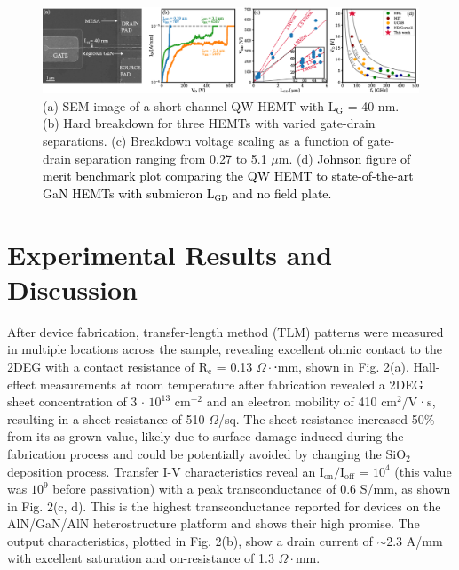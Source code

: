 \documentclass[journal]{IEEEtran}
\begin{document}
\begin{figure}[!t]
\centering
\includegraphics[width=\textwidth]{Figure4_JFoM_largerinset.eps}
\caption{ (a) SEM image of a short-channel QW HEMT with $\mathrm{L_G}$ = 40 nm. (b) Hard breakdown for three HEMTs with varied gate-drain separations. (c) Breakdown voltage scaling as a function of gate-drain separation ranging from 0.27 to 5.1 $\mu$m. (d) \textcolor{black}{Johnson figure of merit benchmark plot comparing the QW HEMT to state-of-the-art GaN HEMTs with submicron $\mathrm{L_{GD}}$ and no field plate.} }
\label{fig:benchmark}
\end{figure}

\section{Experimental Results and Discussion}
\label{sec:Experimental Results and Discussion}
After device fabrication, transfer-length method (TLM) patterns were measured in multiple locations across the sample, revealing excellent ohmic contact to the 2DEG with a contact resistance of $\mathrm{R_c}$ = 0.13 $\Omega\cdot$⋅mm, shown in Fig. 2(a). Hall-effect measurements at room temperature after fabrication revealed a 2DEG sheet concentration of 3 $\cdot$ $\mathrm{10^{13}}$ $\mathrm{cm^{-2}}$ and an electron mobility of 410 $\mathrm{cm^2}$/V·s, resulting in a sheet resistance of 510 $\Omega$/sq. The sheet resistance increased 50\% from its as-grown value, likely due to surface damage induced during the fabrication process and could be potentially avoided by changing the $\mathrm{SiO_2}$ deposition process. Transfer I-V characteristics reveal an $\mathrm{I_{on}}/\mathrm{I_{off}}$ = $\mathrm{10^4}$ (this value was $\mathrm{10^9}$ before passivation) with a peak transconductance of 0.6 S/mm, as shown in Fig. 2(c, d). This is the highest transconductance reported for devices on the AlN/GaN/AlN heterostructure platform and shows their high promise. The output characteristics, plotted in Fig. 2(b), show a drain current of $\sim$2.3 A/mm with excellent saturation and on-resistance of 1.3 $\Omega\cdot$mm.
\end{document}

